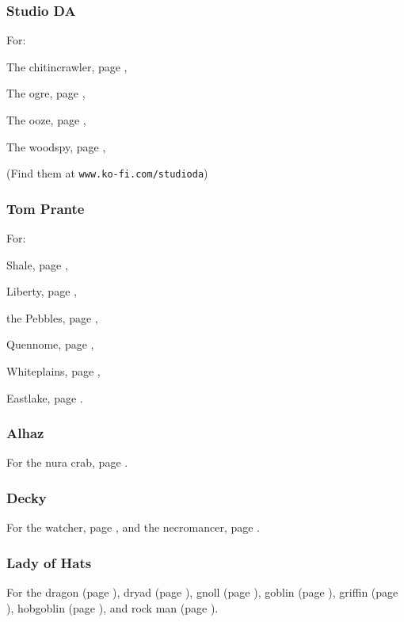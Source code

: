 \begin{multicols}{2}
\subsubsection{Studio DA}

For:

The chitincrawler, page \pageref{da:chitincrawler},

The ogre, page \pageref{da:ogre},

The ooze, page \pageref{da:jelly},

The woodspy, page \pageref{da:woodspy},

(Find them at {\tt www.ko-fi.com/studioda})

\subsubsection{Tom Prante}

For:

Shale, page \pageref{tom:autumn},

Liberty, page \pageref{tom:swamp},

the Pebbles, page \pageref{tom:pebbles},

Quennome, page \pageref{tom:quen},

Whiteplains, page \pageref{tom:whiteplains},

Eastlake, page \pageref{tom:winter}.

\subsubsection{Alhaz}

For the nura crab, page \pageref{Alhaz:crab}.

\subsubsection{Decky}

For the watcher, page \pageref{Decky:watcher},
and the necromancer, page \pageref{Decky:necromancer}.

\subsubsection{Lady of Hats}

For the 
dragon (page \pageref{loh/dragon}),
dryad (page \pageref{loh/dryad}),
gnoll (page \pageref{loh/gnoll}),
goblin (page \pageref{loh/goblin}),
griffin (page \pageref{loh/griffin}),
hobgoblin (page \pageref{loh/hobgoblin}),
and rock man (page \pageref{loh/rockman}).

\end{multicols}

